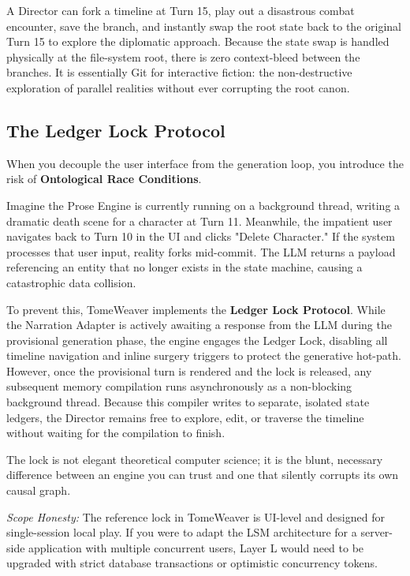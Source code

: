 \documentclass[12pt, a4paper]{article}
\begin{document}
A Director can fork a timeline at Turn 15, play out a disastrous combat encounter, save the branch, and instantly swap the root state back to the original Turn 15 to explore the diplomatic approach. Because the state swap is handled physically at the file-system root, there is zero context-bleed between the branches. It is essentially Git for interactive fiction: the non-destructive exploration of parallel realities without ever corrupting the root canon.

\subsection{The Ledger Lock Protocol}
\label{subsec:lock}

When you decouple the user interface from the generation loop, you introduce the risk of \textbf{Ontological Race Conditions}. 

Imagine the Prose Engine is currently running on a background thread, writing a dramatic death scene for a character at Turn 11. Meanwhile, the impatient user navigates back to Turn 10 in the UI and clicks "Delete Character." If the system processes that user input, reality forks mid-commit. The LLM returns a payload referencing an entity that no longer exists in the state machine, causing a catastrophic data collision.

To prevent this, TomeWeaver implements the \textbf{Ledger Lock Protocol}. While the Narration Adapter is actively awaiting a response from the LLM during the provisional generation phase, the engine engages the Ledger Lock, disabling all timeline navigation and inline surgery triggers to protect the generative hot-path. However, once the provisional turn is rendered and the lock is released, any subsequent memory compilation runs asynchronously as a non-blocking background thread. Because this compiler writes to separate, isolated state ledgers, the Director remains free to explore, edit, or traverse the timeline without waiting for the compilation to finish.

The lock is not elegant theoretical computer science; it is the blunt, necessary difference between an engine you can trust and one that silently corrupts its own causal graph.

\textit{Scope Honesty:} The reference lock in TomeWeaver is UI-level and designed for single-session local play. If you were to adapt the LSM architecture for a server-side application with multiple concurrent users, Layer L would need to be upgraded with strict database transactions or optimistic concurrency tokens.
\end{document}
